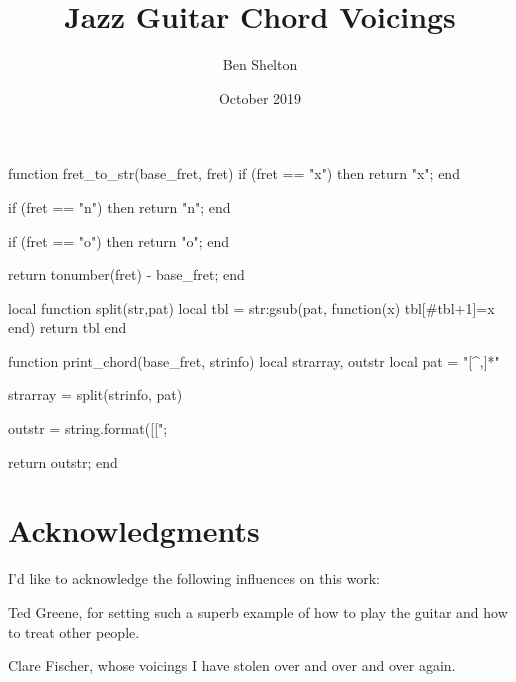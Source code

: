 \documentclass[12pt]{report}
\newcommand{\authorname}{Ben Shelton}
\begin{document}
\begin{luacode*}
function fret_to_str(base_fret, fret)
        if (fret == "x") then
                return "x";
        end
        
        if (fret == "n") then
                return "n";
        end

        if (fret == "o") then
                return "o";
        end

        return tonumber(fret) - base_fret;
end

local function split(str,pat)
   local tbl = {}
   str:gsub(pat, function(x) tbl[#tbl+1]=x end)
   return tbl
end

function print_chord(base_fret, strinfo)
	local strarray, outstr
	local pat = "[^,]*"
        
        strarray = split(strinfo, pat)
        
        outstr = string.format([[\chord{%
        
        outstr = outstr .. fret_to_str(base_fret, strarray[1]) .. ",";
        outstr = outstr .. fret_to_str(base_fret, strarray[2]) .. ",";
        outstr = outstr .. fret_to_str(base_fret, strarray[3]) .. ",";
        outstr = outstr .. fret_to_str(base_fret, strarray[4]) .. ",";
        outstr = outstr .. fret_to_str(base_fret, strarray[5]) .. ",";
        outstr = outstr .. fret_to_str(base_fret, strarray[6]) .. "}";

        return outstr;
end
\end{luacode*}

\newcommand*{\abschord}[2]{%
\directlua{tex.print(print_chord(#1, [[#2]]))}%
}%

\newcommand{\achapter}[2]{
	\chapter{#1}
	\label{#2}
	\markright{\authorname \hfill Chapter \thechapter. #1 \hfill}
}

\title{Jazz Guitar Chord Voicings}
\author{Ben Shelton}
\date{October 2019}

\maketitle

\pagebreak

\chapter*{Acknowledgments}

I'd like to acknowledge the following influences on this work:

Ted Greene, for setting such a superb example of how to play the guitar and how to treat other people.

Clare Fischer, whose voicings I have stolen over and over and over again.

\tableofcontents
\pagebreak

\mediumchords





\end{document}
